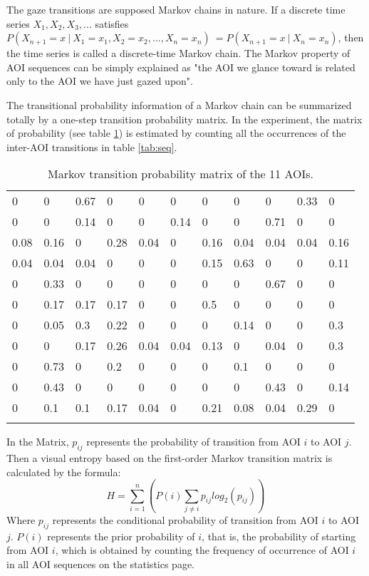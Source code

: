 The gaze transitions are supposed Markov chains in nature. If a discrete time series $X_1,X_2,X_3,...$ satisfies $P(X_{n+1}=x~|~X_1=x_1,X_2=x_2,...,X_n=x_n)~=P(X_{n+1}=x~|~X_n=x_n)$, then the time series is called a discrete-time Markov chain. The Markov property of AOI sequences can be simply explained as "the AOI we glance toward is related only to the AOI we have just gazed upon".

The transitional probability information of a Markov chain can be summarized totally by a one-step transition probability matrix.
In the experiment, the matrix of probability (see table \ref{tab:mat}) is estimated by counting all the occurrences of the inter-AOI transitions in table \ref{tab:seq}.

\begin{table}[H]
\centering
\scriptsize
  \begin{tabular}{@{}lllllllllll@{}}
  0    & 0    & 0.67 & 0    & 0    & 0    & 0    & 0    & 0    & 0.33 & 0    \\
  0    & 0    & 0.14 & 0    & 0    & 0.14 & 0    & 0    & 0.71 & 0    & 0    \\
  0.08 & 0.16 & 0    & 0.28 & 0.04 & 0    & 0.16 & 0.04 & 0.04 & 0.04 & 0.16 \\
  0.04 & 0.04 & 0.04 & 0    & 0    & 0    & 0.15 & 0.63 & 0    & 0    & 0.11 \\
  0    & 0.33 & 0    & 0    & 0    & 0    & 0    & 0    & 0.67 & 0    & 0    \\
  0    & 0.17 & 0.17 & 0.17 & 0    & 0    & 0.5  & 0    & 0    & 0    & 0    \\
  0    & 0.05 & 0.3  & 0.22 & 0    & 0    & 0    & 0.14 & 0    & 0    & 0.3  \\
  0    & 0    & 0.17 & 0.26 & 0.04 & 0.04 & 0.13 & 0    & 0.04 & 0    & 0.3  \\
  0    & 0.73 & 0    & 0.2  & 0    & 0    & 0    & 0.1  & 0    & 0    & 0    \\
  0    & 0.43 & 0    & 0    & 0    & 0    & 0    & 0    & 0.43 & 0    & 0.14 \\
  0    & 0.1  & 0.1  & 0.17 & 0.04 & 0    & 0.21 & 0.08 & 0.04 & 0.29 & 0\\
  \\
  \end{tabular}
\caption{Markov transition probability matrix of the 11 AOIs.}
\label{tab:mat}
\end{table}

In the Matrix, $p_{ij}$ represents the probability of transition from AOI $i$ to AOI $j$.
Then a visual entropy based on the first-order Markov transition matrix is calculated by the formula:
$$H = \sum_{i=1}^n(P(i)\sum_{j\neq i} p_{ij}log_2(p_{ij}))$$
Where $p_{ij}$ represents the conditional probability of transition from AOI $i$ to AOI $j$. $P(i)$ represents the prior probability of $i$, that is, the probability of starting from AOI $i$, which is obtained by counting the frequency of occurrence of AOI $i$ in all AOI sequences on the statistics page.

